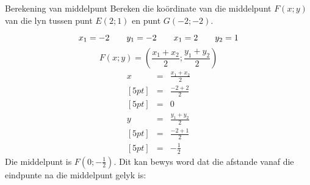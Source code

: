 \begin{wex}{Berekening van middelpunt}
 {Bereken die ko\"ordinate van die middelpunt $F(x;y)$ van die lyn tussen punt $E(2;1)$ en punt $G(-2;-2)$.}
{
\setcounter{subfigure}{0}
\begin{figure}[H] %
\begin{center}
\end{center}
\end{figure} 
\begin{equation*}
x_1 = -2 \hskip2em y_1 = -2 \hskip2em x_1 = 2 \hskip2em y_2 = 1
\end{equation*}
\begin{equation*}
F(x;y)=(\dfrac{{x}_{1} + {x}_{2}}{2};\dfrac{{y}_{1}+{y}_{2}}{2})
\end{equation*}
\begin{eqnarray*}
x & = & \frac{{x}_{1} + {x}_{2}}{2} \\ [5pt]
& = & \frac{-2 + 2}{2} \\ [5pt]
& = & 0 \\ 
y & = & \frac{{y}_{1} + {y}_{2}}{2} \\ [5pt]
& = & \frac{-2 + 1}{2} \\ [5pt]
& = & -\frac{1}{2} 
\end{eqnarray*}
Die middelpunt is $F(0;-\frac{1}{2})$.
Dit kan bewys word dat die afstande vanaf die eindpunte na die middelpunt gelyk is: 
\begin{eqnarray*}

\end{eqnarray*}}
\end{wex}
